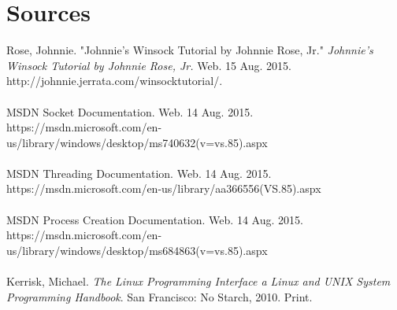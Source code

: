 \documentclass[11pt]{article}
\begin{document}
\section{Sources}

Rose, Johnnie. "Johnnie's Winsock Tutorial by Johnnie Rose, Jr." \textit{Johnnie's Winsock Tutorial by Johnnie Rose, Jr.} Web. 15 Aug. 2015.\\
http://johnnie.jerrata.com/winsocktutorial/. \\ \\

MSDN Socket Documentation. Web. 14 Aug. 2015.\\
https://msdn.microsoft.com/en-us/library/windows/desktop/ms740632(v=vs.85).aspx \\ \\

MSDN Threading Documentation. Web. 14 Aug. 2015. \\
https://msdn.microsoft.com/en-us/library/aa366556(VS.85).aspx \\ \\

MSDN Process Creation Documentation. Web. 14 Aug. 2015. \\
https://msdn.microsoft.com/en-us/library/windows/desktop/ms684863(v=vs.85).aspx \\ \\

Kerrisk, Michael. \textit{The Linux Programming Interface a Linux and UNIX System Programming Handbook}. San Francisco: No Starch, 2010. Print.
\end{document}

